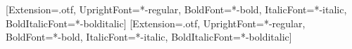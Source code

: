 
\usepackage{iftex}
\ifXeTeX
  \usepackage{fontspec}
  \setmainfont{texgyretermes}[Extension=.otf, UprightFont=*-regular, BoldFont=*-bold,
    ItalicFont=*-italic, BoldItalicFont=*-bolditalic]
  \setsansfont{texgyreheros}[Extension=.otf, UprightFont=*-regular, BoldFont=*-bold,
    ItalicFont=*-italic, BoldItalicFont=*-bolditalic]
\fi

\usepackage{multirow}
\usepackage{makecell}
\usepackage{tikz}
\usetikzlibrary{arrows.meta,positioning,fit,calc,backgrounds,shapes.geometric}
\usepackage{pifont}

\newcommand{\red}[1]{{\color{red}#1}}
\newcommand{\todo}[1]{{\color{red}#1}}
\newcommand{\TODO}[1]{\textbf{\color{red}[TODO: #1]}}

\newcommand{\method}{LeLunar\xspace}
\newcommand{\gap}{\ensuremath{\Delta}\xspace}
\newcommand{\share}{\ensuremath{S}\xspace}
\newcommand{\cmark}{\ding{51}}
\newcommand{\xmark}{\ding{55}}
\newcommand{\LN}{\operatorname{LN}}
\newcommand{\sg}{\operatorname{sg}}
\DeclareMathOperator*{\E}{\mathbb{E}}
